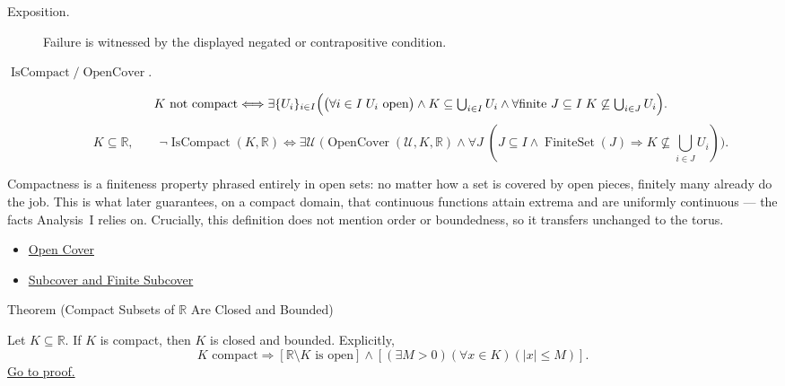 \begin{remark*}
\begin{description}
  \item[Exposition.]
  Failure is witnessed by the displayed negated or contrapositive condition.

  \item[\(\operatorname{IsCompact} / \operatorname{OpenCover}.\)]
  \[
K \text{ not compact} \Longleftrightarrow \exists \{U_i\}_{i\in I}\Bigl(\bigl(\forall i\in I\;U_i \text{ open}\bigr)\land K\subseteq\textstyle\bigcup_{i\in I}U_i \land \forall \text{finite } J\subseteq I\;K\not\subseteq\textstyle\bigcup_{i\in J}U_i\Bigr).
\]
\[
K\subseteq\mathbb{R},\qquad
\neg\operatorname{IsCompact}(K,\mathbb{R})
\Longleftrightarrow
\exists \mathcal{U}\;\bigl(\operatorname{OpenCover}(\mathcal{U},K,\mathbb{R})
\land \forall J\;(J\subseteq I\land \operatorname{FiniteSet}(J)
\Longrightarrow K\not\subseteq\textstyle\bigcup_{i\in J}U_i)\bigr).
\]
\end{description}
\end{remark*}
\begin{remark*}[Interpretation]
Compactness is a finiteness property phrased entirely in open sets: no matter how a set is covered by open pieces, finitely many already do the job. This is what later guarantees, on a compact domain, that continuous functions attain extrema and are uniformly continuous --- the facts Analysis~I relies on. Crucially, this definition does not mention order or boundedness, so it transfers unchanged to the torus.
\end{remark*}
\begin{dependencies}
\begin{itemize}
  \item \hyperref[def:real-open-cover]{Open Cover}
  \item \hyperref[def:finite-subcover]{Subcover and Finite Subcover}
\end{itemize}
\end{dependencies}
\begin{theorembox}{Theorem (Compact Subsets of $\mathbb{R}$ Are Closed and Bounded)}
\begin{theorem}
\label{thm:compact-implies-closed-bounded}
Let $K\subseteq\mathbb{R}$.  If $K$ is compact, then $K$ is closed and
bounded.  Explicitly,
\[
  K\text{ compact}
  \Longrightarrow
  \left[
  \mathbb{R}\setminus K\text{ is open}
  \right]
  \land
  \left[
  (\exists M>0)(\forall x\in K)(|x|\leq M)
  \right].
\]
\hyperref[prf:compact-implies-closed-bounded]{Go to proof.}
\end{theorem}
\end{theorembox}
